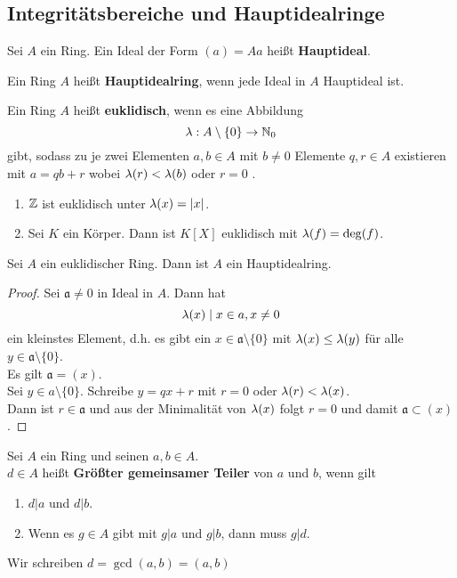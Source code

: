 	\subsection{Integritätsbereiche und Hauptidealringe}
	\begin{definition}
		Sei $A$ ein Ring. Ein Ideal der Form $(a)=Aa$ heißt \textbf{Hauptideal}.
	\end{definition}

	\begin{definition}
		Ein Ring $A$ heißt \textbf{Hauptidealring}, wenn jede Ideal in $A$ Hauptideal ist.
	\end{definition}

	\begin{definition}
		Ein Ring $A$ heißt \textbf{euklidisch}, wenn es eine Abbildung 
		\[\lambda:A\setminus \{0\}\to \mathbb{N}_0\]
		gibt, sodass zu je zwei Elementen $a,b\in A$ mit $b\neq 0$ Elemente $q,r\in A$ existieren mit $a=qb+r$ wobei $\lambda(r)<\lambda(b)$ oder $r=0$ .
	\end{definition}

	\begin{exm}
		\begin{enumerate}
			\item $\mathbb{Z}$ ist euklidisch unter $\lambda(x)=|x|$.
			\item Sei $K$ ein Körper. Dann ist $K[X]$ euklidisch mit $\lambda(f)=\deg(f)$.
		\end{enumerate}
	\end{exm}

	\begin{satz}
		Sei $A$ ein euklidischer Ring. Dann ist $A$ ein Hauptidealring.
	\end{satz}
	\begin{proof}
		Sei $\mathfrak a\neq 0$ in Ideal in $A$. Dann hat
		\[\lambda(x)\mid x\in a,x\neq 0\] ein kleinstes Element, d.h. es gibt ein $x\in \mathfrak a\setminus\{0\}$ mit $\lambda(x)\leq\lambda(y)$ für alle $y\in \mathfrak a\setminus \{0\}$.\\
		Es gilt $\mathfrak a=(x)$.\\
		Sei $y\in a\setminus\{0\}$. Schreibe $y=qx+r$ mit $r=0$ oder $\lambda(r)<\lambda(x)$.\\
		Dann ist $r\in\mathfrak a$ und aus der Minimalität von $\lambda(x)$ folgt $r=0$ und damit $\mathfrak a\subset (x)$.
	\end{proof}

	\begin{definition}
		Sei $A$ ein Ring und seinen $a,b\in A$.\\
		$d\in A$ heißt \textbf{Größter gemeinsamer Teiler} von $a$ und $b$, wenn gilt
		\begin{enumerate}
			\item $d|a$ und $d|b$.
			\item Wenn es $g\in A$ gibt mit $g|a$ und $g|b$, dann muss $g|d$.
		\end{enumerate}
		Wir schreiben $d=\gcd(a,b)=(a,b)$
	\end{definition}

